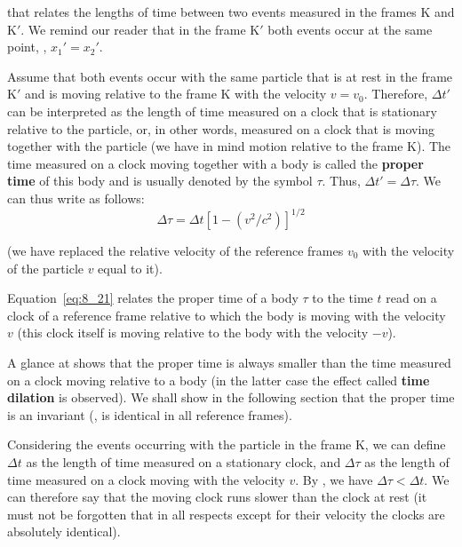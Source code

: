 \noindent
that relates the lengths of time between two events measured in the frames K and K$'$. We remind our reader that in the frame K$'$ both events occur at the same point, \ie, $x_1'=x_2'$.

Assume that both events occur with the same particle that is at rest in the frame K$'$ and is moving relative to the frame K with the velocity $v=v_0$. Therefore, $\Delta t'$ can be interpreted as the length of time measured on a clock that is stationary relative to the particle, or, in other words, measured on a clock that is moving together with the particle (we have in mind motion relative to the frame K). The time measured on a clock moving together with a body is called the \textbf{proper time} of this body and is usually denoted by the symbol $\tau$. Thus, $\Delta t' = \Delta\tau$. We can thus write  as follows:
\begin{equation}\label{eq:8_21}
	\Delta\tau = \Delta t \left[1 - \left(v^2/c^2\right) \right]^{1/2}
\end{equation}

\noindent
(we have replaced the relative velocity of the reference frames $v_0$ with the velocity of the particle $v$ equal to it).

Equation~\eqref{eq:8_21} relates the proper time of a body $\tau$ to the time $t$ read on a clock of a reference frame relative to which the body is moving with the velocity $v$ (this clock itself is moving relative to the body with the velocity $-v$).

A glance at  shows that the proper time is always smaller than the time measured on a clock moving relative to a body (in the latter case the effect called \textbf{time dilation} is observed). We shall show in the following section that the proper time is an invariant (\ie, is identical in all reference frames).

Considering the events occurring with the particle in the frame K, we can define $\Delta t$ as the length of time measured on a stationary clock, and $\Delta\tau$ as the length of time measured on a clock moving with the velocity $v$. By , we have $\Delta\tau<\Delta t$. We can therefore say that the moving clock runs slower than the clock at rest (it must not be forgotten that in all respects except for their velocity the clocks are absolutely identical).

